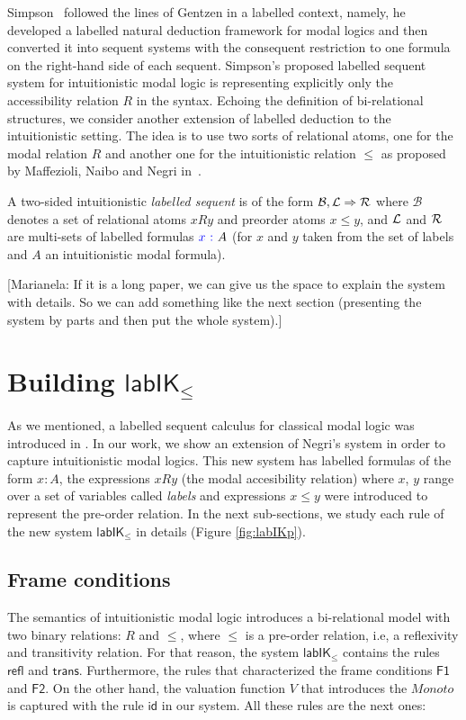\documentclass[twoside]{aiml18}
\newcommand{\marianela}[1]{{\color{purple}[Marianela: #1]}}
\newcommand{\B}{\mathcal{B}}
\newcommand*{\lab}{\mathsf{lab}}
\newcommand*{\IK}{\mathsf{IK}}
\newcommand*{\labIKp}{\lab\IK_{\le}}
\newcommand*{\labels}[2]{{\color{blue}{#1}\:\colon}{#2}}
\newcommand{\SEQ}{\Rightarrow}
\newcommand*{\rn}[1]  {\ensuremath{\mathsf{#1}}}
\newcommand*{\rel}{R}
\begin{document}
Simpson~\cite{Simpson} followed the lines of Gentzen in a labelled context, namely, he developed a labelled natural deduction framework for modal logics and then converted it into sequent systems with the consequent restriction to one formula on the right-hand side of each sequent. Simpson's proposed labelled sequent system for intuitionistic modal logic is representing explicitly only the accessibility relation $\rel$ in the syntax.
%
Echoing the definition of bi-relational structures, we consider another extension of labelled deduction to the intuitionistic setting. 
%
The idea is to use two sorts of relational atoms, one for the modal relation $\rel$ and another one for the intuitionistic relation $\leq$ as proposed by Maffezioli, Naibo and Negri in~\cite{Maffezioli}. 
%


\begin{definition}
A two-sided intuitionistic \emph{labelled sequent} is of the form $\B, \Left \SEQ \Right$ where $\B$ denotes a set of relational atoms $x \rel y$ and preorder atoms $x \le y$, and $\mathcal{L}$ and $\mathcal{R}$ are multi-sets of labelled formulas $\labels{x}{A}$ (for $x$ and $y$ taken from the set of labels and $A$ an intuitionistic modal formula).
\end{definition}

\marianela{If it is a long paper, we can give us the space to explain the system with details. So we can add something like the next section (presenting the system by parts and then put the whole system).}

\section{Building $\labIKp$}

As we mentioned, a labelled sequent calculus for classical modal logic was introduced in \cite{Negri}. In our work, we show an extension of Negri's system in order to capture intuitionistic modal logics. This new system has labelled formulas of the form $x \colon A$, the expressions $xRy$ (the modal accesibility relation) where $x$, $y$ range over a set of variables called \emph{labels} and expressions $x \le y$ were introduced to represent the pre-order relation. In the next sub-sections, we study each rule of the new system $\labIKp$ in details (Figure \ref{fig:labIKp}). 

\subsection{Frame conditions}
The semantics of intuitionistic modal logic introduces a bi-relational model with two binary relations: $R$ and $\le$, where $\le$ is a pre-order relation, i.e, a reflexivity and transitivity relation. For that reason, the system $\labIKp$ contains the rules $\rn{refl}$ and $\rn{trans}$. Furthermore, the rules that characterized the frame conditions $\rn{F1}$ and $\rn{F2}$. On the other hand, the valuation function $V$ that introduces the $Monoto$ is captured with the rule $\rn{id}$ in our system. All these rules are the next ones:
\end{document}
